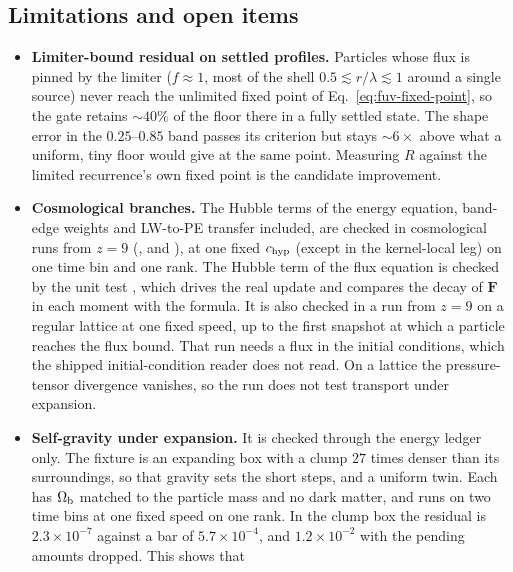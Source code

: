 \subsection{Limitations and open items}
\label{sec:fuv-limits}

\begin{itemize}
  \item \textbf{Limiter-bound residual on settled profiles.} Particles
    whose flux is pinned by the limiter ($f\approx1$, most of the shell
    $0.5\lesssim r/\lambda\lesssim1$ around a single source) never reach
    the unlimited fixed point of Eq.~\ref{eq:fuv-fixed-point}, so the
    gate retains $\sim40\%$ of the floor there in a fully settled
    state. The shape error in the $0.25$--$0.85$ band passes its
    criterion but stays $\sim6\times$ above what a uniform, tiny floor
    would give at the same point. Measuring $R$ against the limited
    recurrence's own fixed point is the candidate improvement.
  \item \textbf{Cosmological branches.} The Hubble terms of the energy
    equation, band-edge weights and LW-to-PE transfer included, are
    checked in cosmological runs from $z=9$ (,
     and ), at one
    fixed $c_{\rm hyp}$ (except in the kernel-local  leg) on one time bin and one rank. The Hubble term of
    the flux equation is checked by the unit test
    , which drives the real update
    and compares the decay of $\mathbf F$ in each moment with the
    formula. It is also checked in a run from $z = 9$ on a regular lattice
    at one fixed speed, up to the first snapshot at which a particle
    reaches the flux bound. That run needs a flux in the initial
    conditions, which the shipped initial-condition reader does not read.
    On a lattice the pressure-tensor divergence vanishes, so the run does
    not test transport under expansion.
  \item \textbf{Self-gravity under expansion.} It is checked through the
    energy ledger only. The fixture is an expanding box with a clump $27$
    times denser than its surroundings, so that gravity sets the short
    steps, and a uniform twin. Each has $\Omega_{\rm b}$ matched to the
    particle mass and no dark matter, and runs on two time bins at one
    fixed speed on one rank. In the clump box the residual is
    $2.3\times10^{-7}$ against a bar of $5.7\times10^{-4}$, and
    $1.2\times10^{-2}$ with the pending amounts dropped. This shows that

\end{itemize}

